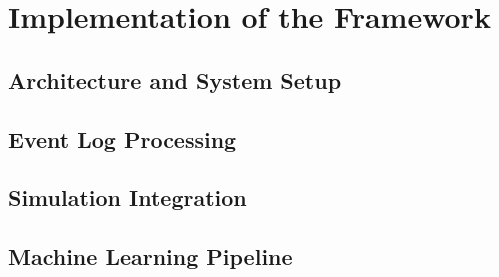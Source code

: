 \chapter{Implementation of the Framework}
\label{chap:implementation}

\section{Architecture and System Setup}

\section{Event Log Processing}

\section{Simulation Integration}

\section{Machine Learning Pipeline}
